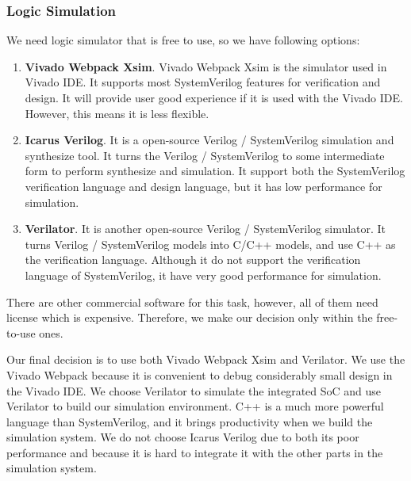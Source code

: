 \subsubsection{Logic Simulation}
We need logic simulator that is free to use, so we have following options:
\begin{enumerate}
    \item \textbf{Vivado Webpack Xsim}. Vivado Webpack Xsim is the simulator used in Vivado IDE. It supports most SystemVerilog features for verification and design. It will provide user good experience if it is used with the Vivado IDE. However, this means it is less flexible.
    \item \textbf{Icarus Verilog}. It is a open-source Verilog / SystemVerilog simulation and synthesize tool. It turns the Verilog / SystemVerilog to some intermediate form to perform synthesize and simulation. It support both the SystemVerilog verification language and design language, but it has low performance for simulation.
    \item \textbf{Verilator}. It is another open-source Verilog / SystemVerilog simulator. It turns Verilog / SystemVerilog models into C/C++ models, and use C++ as the verification language. Although it do not support the verification language of SystemVerilog, it have very good performance for simulation.
\end{enumerate}
There are other commercial software for this task, however, all of them need license which is expensive. Therefore, we make our decision only within the free-to-use ones.

Our final decision is to use both Vivado Webpack Xsim and  Verilator. We use the Vivado Webpack because it is convenient to debug considerably small design in the Vivado IDE. We choose Verilator to simulate the integrated SoC and use Verilator to build our simulation environment. C++ is a much more powerful language than SystemVerilog, and it brings productivity when we build the simulation system. We do not choose Icarus Verilog due to both its poor performance and because it is hard to integrate it with the other parts in the simulation system.

